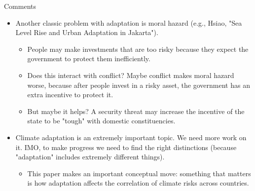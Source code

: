 \documentclass[ignorenonframetext,c,12pt]{beamer}
\begin{document}
\begin{frame}{Comments}\vspace{0.5em}
  \begin{itemize}
    \item Another classic problem with adaptation is moral hazard (e.g., Hsiao, "Sea Level Rise and Urban Adaptation in Jakarta").
    \begin{itemize}
      \item People may make investments that are too risky because they expect the government to protect them inefficiently.
      \item Does this interact with conflict? Maybe conflict makes moral hazard worse, because after people invest in a risky asset, the government has an extra incentive to protect it.
      \item But maybe it helps? A security threat may increase the incentive of the state to be "tough" with domestic constituencies.
    \end{itemize}
    \item Climate adaptation is an extremely important topic. We need more work on it. IMO, to make progress we need to find the right distinctions (because "adaptation" includes extremely different things).
    \begin{itemize}
      \item This paper makes an important conceptual move: something that matters is how adaptation affects the correlation of climate risks across countries.
    \end{itemize}
  \end{itemize}
\end{frame}
\end{document}
